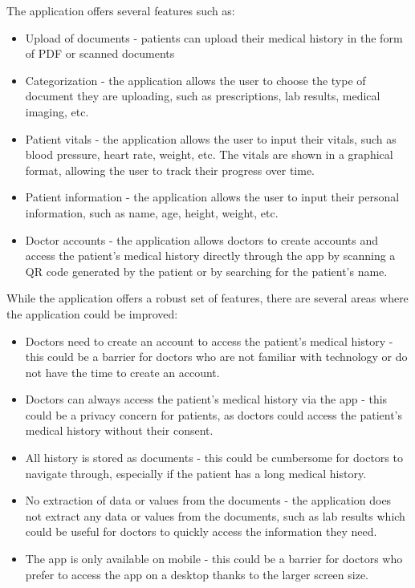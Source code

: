 The application offers several features such as:
\begin{itemize}
    \item Upload of documents - patients can upload their medical history in the form of PDF or scanned documents
    \item Categorization - the application allows the user to choose the type of document they are uploading, such as prescriptions, lab results, medical imaging, etc.
    \item Patient vitals - the application allows the user to input their vitals, such as blood pressure, heart rate, weight, etc. The vitals are shown in a graphical format, allowing the user to track their progress over time.
    \item Patient information - the application allows the user to input their personal information, such as name, age, height, weight, etc.
    \item Doctor accounts - the application allows doctors to create accounts and access the patient's medical history directly through the app by scanning a QR code generated by the patient or by searching for the patient's name.
\end{itemize}

While the application offers a robust set of features, there are several areas where the application could be improved:
\begin{itemize}
    \item Doctors need to create an account to access the patient's medical history - this could be a barrier for doctors who are not familiar with technology or do not have the time to create an account.
    \item Doctors can always access the patient's medical history via the app - this could be a privacy concern for patients, as doctors could access the patient's medical history without their consent.
    \item All history is stored as documents - this could be cumbersome for doctors to navigate through, especially if the patient has a long medical history.
    \item No extraction of data or values from the documents - the application does not extract any data or values from the documents, such as lab results which could be useful for doctors to quickly access the information they need.
    \item The app is only available on mobile - this could be a barrier for doctors who prefer to access the app on a desktop thanks to the larger screen size.
\end{itemize}

